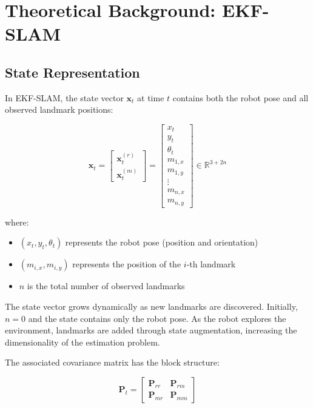 \documentclass[12pt,a4paper]{article}
\newcommand{\state}{\bm{x}}
\newcommand{\covariance}{\bm{P}}
\begin{document}
\section{Theoretical Background: EKF-SLAM}

\subsection{State Representation}

In EKF-SLAM, the state vector $\state_t$ at time $t$ contains both the robot pose and all observed landmark positions:

\begin{equation}
    \state_t = \begin{bmatrix}
        \state_t^{(r)} \\
        \state_t^{(m)}
    \end{bmatrix} = \begin{bmatrix}
        x_t \\ y_t \\ \theta_t \\ m_{1,x} \\ m_{1,y} \\ \vdots \\ m_{n,x} \\ m_{n,y}
    \end{bmatrix} \in \mathbb{R}^{3+2n}
\end{equation}

where:
\begin{itemize}[noitemsep]
    \item $(x_t, y_t, \theta_t)$ represents the robot pose (position and orientation)
    \item $(m_{i,x}, m_{i,y})$ represents the position of the $i$-th landmark
    \item $n$ is the total number of observed landmarks
\end{itemize}

The state vector grows dynamically as new landmarks are discovered. Initially, $n=0$ and the state contains only the robot pose. As the robot explores the environment, landmarks are added through state augmentation, increasing the dimensionality of the estimation problem.

The associated covariance matrix has the block structure:

\begin{equation}
    \covariance_t = \begin{bmatrix}
        \covariance_{rr} & \covariance_{rm} \\
        \covariance_{mr} & \covariance_{mm}
    \end{bmatrix}
\end{equation}
\end{document}
